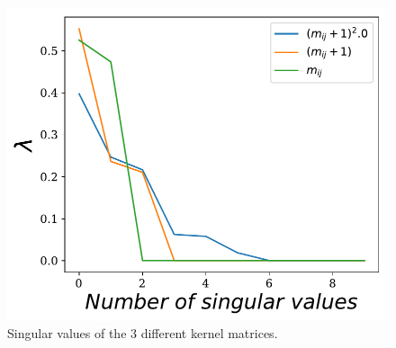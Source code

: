 \documentclass[14pt]{article}
\begin{document}
\begin{figure}[H]
\centering
\includegraphics[scale=0.5]{SVDs_kernels.pdf}
\caption{ Singular values of the 3 different kernel
matrices.\label{fig:svds}}
\end{figure}
\end{document}
